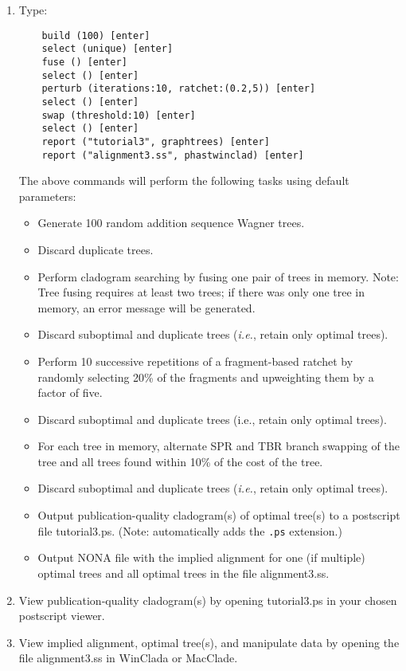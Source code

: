 \begin{enumerate}
\item Type: 
\begin{verbatim}
    build (100) [enter]
    select (unique) [enter]
    fuse () [enter]
    select () [enter]
    perturb (iterations:10, ratchet:(0.2,5)) [enter]
    select () [enter]
    swap (threshold:10) [enter]
    select () [enter]
    report ("tutorial3", graphtrees) [enter]
    report ("alignment3.ss", phastwinclad) [enter]
\end{verbatim}

The above commands will perform the following tasks using default parameters:
\begin{itemize}
\item Generate 100 random addition sequence Wagner trees.
\item Discard duplicate trees.
\item Perform cladogram searching by fusing one pair of trees in memory. Note: Tree 
fusing requires at least two trees; if there was only one tree in memory, 
an error message will be generated. 
\item Discard suboptimal and duplicate trees (\emph{i.e.}, retain only optimal trees).
\item Perform 10 successive repetitions of a fragment-based ratchet by randomly 
selecting 20\% of the fragments and upweighting them by a factor of five.
\item Discard suboptimal and duplicate trees (i.e., retain only optimal trees).
\item For each tree in memory, alternate SPR and TBR branch swapping of the tree 
and all trees found within 10\% of the cost of the tree.
\item Discard suboptimal and duplicate trees (\emph{i.e.}, retain only optimal trees).
\item Output publication-quality cladogram(s) of optimal tree(s) to a postscript 
file tutorial3.ps. (Note: \poy automatically adds the \texttt{.ps} extension.)
\item Output NONA file with the implied alignment for one (if multiple) optimal 
trees and all optimal trees in the file alignment3.ss.
\end{itemize}

\item View publication-quality cladogram(s) by opening tutorial3.ps in your chosen 
postscript viewer.
\item View implied alignment, optimal tree(s), and manipulate data by opening the 
file alignment3.ss in WinClada or MacClade.

\end{enumerate}

